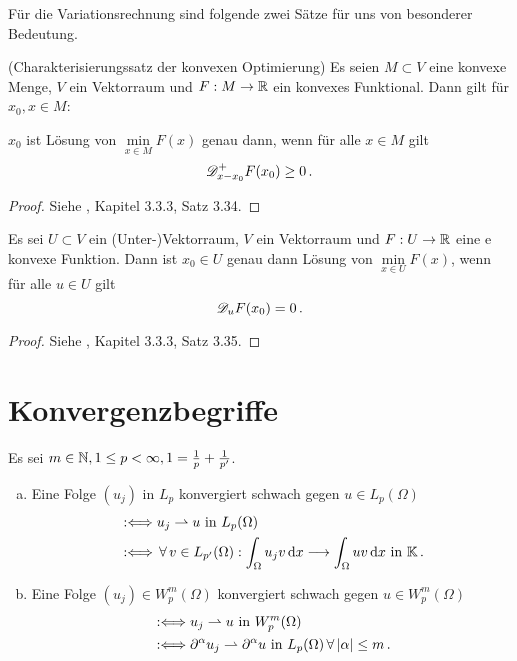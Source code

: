 Für die Variationsrechnung sind folgende zwei Sätze für uns von besonderer Bedeutung.

\begin{satz}\label{satz:A.10}
\textnormal{(Charakterisierungssatz der konvexen Optimierung)} Es seien $M \subset V$ eine konvexe Menge, $V$ ein Vektorraum und $F : M \rightarrow \mathbb{R}$ ein konvexes Funktional. Dann gilt für $x_0, x \in M$:

$x_0$ ist Lösung von $\min\limits_{x \in M} F(x)$ genau dann, wenn für alle $x \in M$ gilt
\[
	\mathscr D^+_{x-x_0} F(x_0) \ge 0 \, .
\]
\end{satz}

\begin{proof}
Siehe \cite{GopRieTam}, Kapitel 3.3.3, Satz 3.34.
\end{proof}

\begin{satz}
Es sei $U\subset V$ ein (Unter-)Vektorraum, $V$ ein Vektorraum und $F: U \rightarrow \mathbb{R}$ eine e konvexe Funktion. Dann ist $x_0 \in U$ genau dann Lösung von $\min\limits_{x \in U} F(x)$, wenn für alle $u \in U$ gilt
\[
	\mathscr D_u F(x_0) = 0 \, .
\]
\end{satz}

\begin{proof}
Siehe \cite{GopRieTam}, Kapitel 3.3.3, Satz 3.35.
\end{proof}


\section{Konvergenzbegriffe}
\label{anhang:A.3}

\begin{defi}\label{defi:A.12}
Es sei $m\in \mathbb{N}, 1\leq p < \infty, 1 = \frac 1 p + \frac 1 {p'}$.
\begin{enumerate}[(a)]
\item Eine Folge $(u_j)$ in $L_p$ konvergiert schwach gegen $u \in L_p(\Omega)$
\begin{align*}
	&: \Longleftrightarrow u_j \rightharpoonup u \text{ in } L_p(\Omega) \\
	& : \Longleftrightarrow \, \forall \, v \in L_{p'}(\Omega) : \int_\Omega u_j v \,\mathrm{d} x \longrightarrow \int_\Omega uv \,\mathrm{d} x \text{ in } \mathbb{K} \, .
\end{align*}
\item Eine Folge $(u_j) \in W^m_p(\Omega)$ konvergiert schwach gegen $u \in W_p^m (\Omega)$
\begin{align*}
	& : \Longleftrightarrow u_j \rightharpoonup u \text{ in } W_p^m(\Omega) \\
	& : \Longleftrightarrow \partial^\alpha u_j \rightharpoonup \partial^\alpha u \text{ in } L_p(\Omega) \, \forall \, \lvert \alpha\rvert \leq m \, .
\end{align*}
\end{enumerate}
\end{defi}


